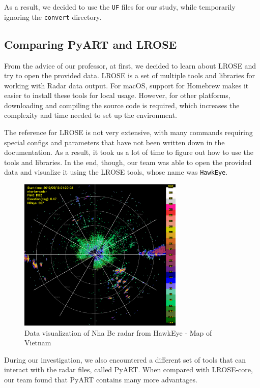 As a result, we decided to use the \texttt{UF} files for our study, while temporarily ignoring the \texttt{convert} directory.


\subsection{Comparing PyART and LROSE}
From the advice of our professor, at first, we decided to learn about LROSE and try to open the provided data.
LROSE is a set of multiple tools and libraries for working with Radar data output.
For macOS, support for Homebrew makes it easier to install these tools for local usage.
However, for other platforms, downloading and compiling the source code is required,
which increases the complexity and time needed to set up the environment.

The reference for LROSE is not very extensive, with many commands requiring special configs and parameters that have not been written down
in the documentation. As a result, it took us a lot of time to figure out how to use the tools and libraries. In the end, though,
our team was able to open the provided data and visualize it using the LROSE tools, whose name was \texttt{HawkEye}.

\begin{figure}[H]
    \centering
    \includegraphics[width=0.7\textwidth]{Images/3.1-201905130120.DBZ-hawkeye.png}
    \vspace{2em}
    \caption{Data visualization of Nha Be radar from HawkEye - Map of Vietnam}
    \label{fig:hawkeye}
\end{figure}

During our investigation, we also encountered a different set of tools that can interact with the radar files, called PyART.
When compared with LROSE-core, our team found that PyART contains many more advantages.

